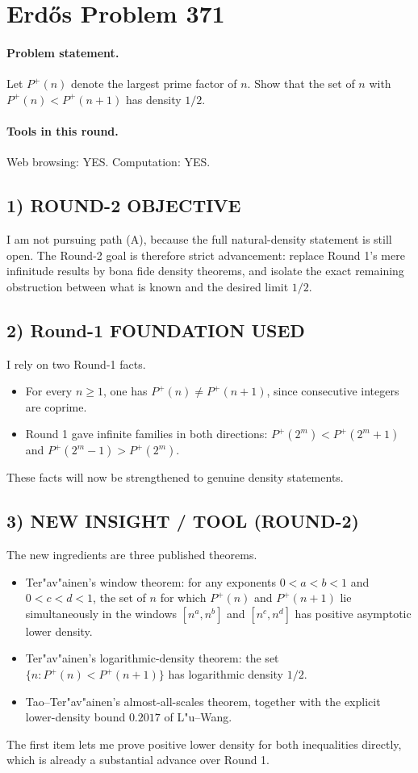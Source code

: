 \section{Erd\H{o}s Problem 371}

\paragraph{Problem statement.}
Let $P^{+}(n)$ denote the largest prime factor of $n$. Show that the set of $n$ with $P^{+}(n)<P^{+}(n+1)$ has density $1/2$.

\paragraph{Tools in this round.}
Web browsing: YES. Computation: YES.

\subsection*{1) ROUND-2 OBJECTIVE}
I am not pursuing path (A), because the full natural-density statement is still open. The Round-2 goal is therefore strict advancement: replace Round 1's mere infinitude results by bona fide density theorems, and isolate the exact remaining obstruction between what is known and the desired limit $1/2$.

\subsection*{2) Round-1 FOUNDATION USED}
I rely on two Round-1 facts.
\begin{itemize}
\item For every $n\geq 1$, one has $P^{+}(n)\neq P^{+}(n+1)$, since consecutive integers are coprime.
\item Round 1 gave infinite families in both directions: $P^{+}(2^{m})<P^{+}(2^{m}+1)$ and $P^{+}(2^{m}-1)>P^{+}(2^{m})$.
\end{itemize}
These facts will now be strengthened to genuine density statements.

\subsection*{3) NEW INSIGHT / TOOL (ROUND-2)}
The new ingredients are three published theorems.
\begin{itemize}
\item Ter"av"ainen's window theorem: for any exponents $0<a<b<1$ and $0<c<d<1$, the set of $n$ for which $P^{+}(n)$ and $P^{+}(n+1)$ lie simultaneously in the windows $[n^{a},n^{b}]$ and $[n^{c},n^{d}]$ has positive asymptotic lower density.
\item Ter"av"ainen's logarithmic-density theorem: the set $\{n:P^{+}(n)<P^{+}(n+1)\}$ has logarithmic density $1/2$.
\item Tao--Ter"av"ainen's almost-all-scales theorem, together with the explicit lower-density bound $0.2017$ of L"u--Wang.
\end{itemize}
The first item lets me prove positive lower density for both inequalities directly, which is already a substantial advance over Round 1.

